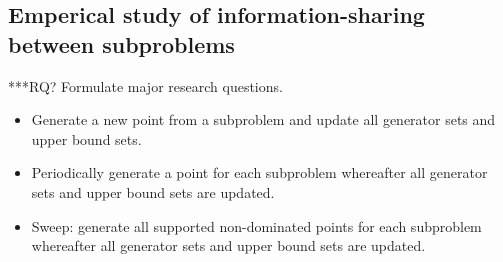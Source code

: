 \subsection{Emperical study of information-sharing between subproblems}
***RQ? Formulate major research questions.

\begin{itemize}
	\item 
Generate a new point from a subproblem and update all generator sets and upper bound sets.
	\item 
Periodically generate a point for each subproblem whereafter all generator sets and upper bound sets are updated.
	\item 
Sweep: generate all supported non-dominated points for each subproblem whereafter all generator sets and upper bound sets are updated.
\end{itemize}
